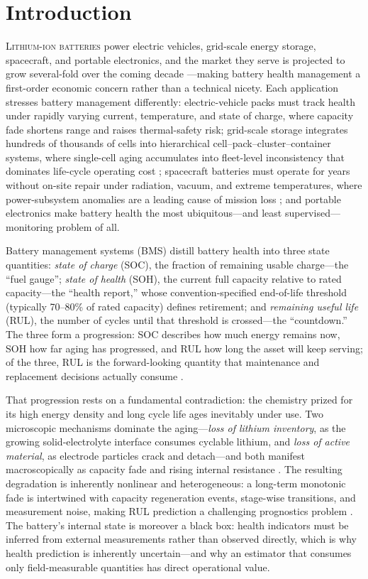 ﻿\section{Introduction}
\label{sec:intro}

\lettrine{L}{ithium-ion batteries} power electric vehicles, grid-scale energy
storage, spacecraft, and portable electronics, and the market they
serve is projected to grow several-fold over the coming decade
\cite{ref_yang_review,ref_sbarra_dt}---making battery health
management a first-order economic concern rather than a technical
nicety. Each application stresses battery management differently:
electric-vehicle packs must track health under rapidly varying
current, temperature, and state of charge, where capacity fade
shortens range and raises thermal-safety risk; grid-scale storage
integrates hundreds of thousands of cells into hierarchical
cell--pack--cluster--container systems, where single-cell aging
accumulates into fleet-level inconsistency that dominates life-cycle
operating cost \cite{ref_qu_bess}; spacecraft batteries must operate
for years without on-site repair under radiation, vacuum, and
extreme temperatures, where power-subsystem anomalies are a leading
cause of mission loss \cite{ref_sbarra_dt}; and portable electronics
make battery health the most ubiquitous---and least
supervised---monitoring problem of all.

Battery management systems (BMS) distill battery health into three
state quantities: \emph{state of charge} (SOC), the fraction of
remaining usable charge---the ``fuel gauge''; \emph{state of health}
(SOH), the current full capacity relative to rated capacity---the
``health report,'' whose convention-specified end-of-life threshold
(typically 70--80\% of rated capacity) defines retirement; and
\emph{remaining useful life} (RUL), the number of cycles until that
threshold is crossed---the ``countdown.'' The three form a
progression: SOC describes how much energy remains now, SOH how far
aging has progressed, and RUL how long the asset will keep serving;
of the three, RUL is the forward-looking quantity that maintenance
and replacement decisions actually consume
\cite{ref_yang_review,ref_sbarra_dt}.

That progression rests on a fundamental contradiction: the chemistry
prized for its high energy density and long cycle life ages
inevitably under use. Two microscopic mechanisms dominate the
aging---\emph{loss of lithium inventory}, as the growing
solid-electrolyte interface consumes cyclable lithium, and
\emph{loss of active material}, as electrode particles crack and
detach---and both manifest macroscopically as capacity fade and
rising internal resistance \cite{ref_yang_review}. The resulting
degradation is inherently nonlinear and heterogeneous: a long-term
monotonic fade is intertwined with capacity regeneration events,
stage-wise transitions, and measurement noise, making RUL prediction
a challenging prognostics problem \cite{ref_rulmamba,ref_omnitie}.
The battery's internal state is moreover a black box: health
indicators must be inferred from external measurements rather than
observed directly, which is why health prediction is inherently
uncertain---and why an estimator that consumes only
field-measurable quantities has direct operational value.

